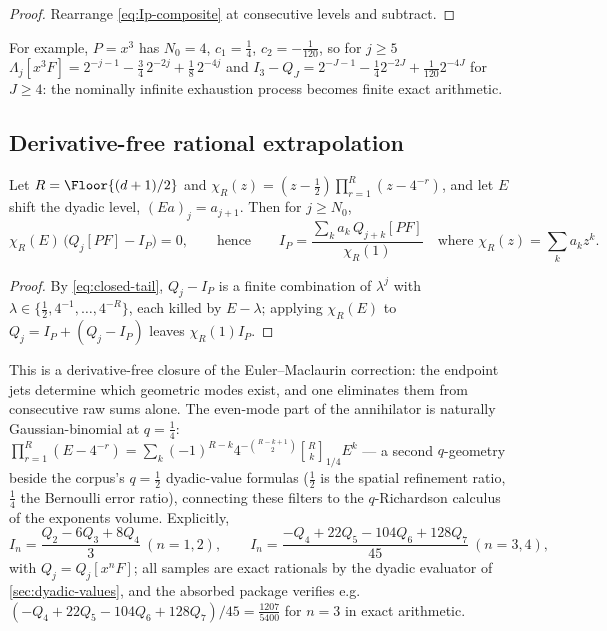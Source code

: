 \begin{proof}
Rearrange \eqref{eq:Ip-composite} at consecutive levels and subtract.
\end{proof}

For example, $P=x^{3}$ has $N_0=4$, $c_1=\tfrac14$,
$c_2=-\tfrac1{120}$, so for $j\ge5$
$\Lambda_j[x^{3}F]=2^{-j-1}-\tfrac34\,2^{-2j}+\tfrac18\,2^{-4j}$ and
$I_3-Q_J=2^{-J-1}-\tfrac14 2^{-2J}+\tfrac1{120}2^{-4J}$ for
$J\ge4$: the nominally infinite exhaustion process becomes finite
exact arithmetic.

\subsection{Derivative-free rational extrapolation}

\begin{theorem}
\label{thm:annihilator-comb}
Let $R=\Floor{(d+1)/2}$ and
$\chi_R(z)=(z-\tfrac12)\prod_{r=1}^{R}(z-4^{-r})$, and let $E$ shift
the dyadic level, $(Ea)_j=a_{j+1}$.  Then for $j\ge N_0$,
\begin{equation}
 \chi_R(E)\,\bigl(Q_j[PF]-I_P\bigr)=0,
 \qquad\text{hence}\qquad
 I_P=\frac{\sum_{k}a_k\,Q_{j+k}[PF]}{\chi_R(1)}
 \quad\text{where }\chi_R(z)=\sum_ka_kz^{k}.
 \label{eq:annihilator}
\end{equation}
\end{theorem}

\begin{proof}
By \eqref{eq:closed-tail}, $Q_j-I_P$ is a finite combination of
$\lambda^{j}$ with
$\lambda\in\{\tfrac12,4^{-1},\ldots,4^{-R}\}$, each killed by
$E-\lambda$; applying $\chi_R(E)$ to $Q_j=I_P+(Q_j-I_P)$ leaves
$\chi_R(1)I_P$.
\end{proof}

This is a derivative-free closure of the Euler--Maclaurin correction:
the endpoint jets determine which geometric modes exist, and one
eliminates them from consecutive raw sums alone.  The even-mode part
of the annihilator is naturally Gaussian-binomial at $q=\tfrac14$:
$\prod_{r=1}^{R}(E-4^{-r})
=\sum_{k}(-1)^{R-k}4^{-\binom{R-k+1}2}
\genfrac{[}{]}{0pt}{}{R}{k}_{1/4}E^{k}$ --- a second $q$-geometry
beside the corpus's $q=\tfrac12$ dyadic-value formulas ($\tfrac12$ is
the spatial refinement ratio, $\tfrac14$ the Bernoulli error ratio),
connecting these filters to the $q$-Richardson calculus of the
exponents volume.  Explicitly,
\begin{equation}
 I_n=\frac{Q_2-6Q_3+8Q_4}{3}\ (n=1,2),
 \qquad
 I_n=\frac{-Q_4+22Q_5-104Q_6+128Q_7}{45}\ (n=3,4),
 \label{eq:richardson-explicit}
\end{equation}
with $Q_j=Q_j[x^{n}F]$; all samples are exact rationals by the dyadic
evaluator of \cref{sec:dyadic-values}, and the absorbed package
verifies e.g.\ $(-Q_4+22Q_5-104Q_6+128Q_7)/45=\tfrac{1207}{5400}$ for
$n=3$ in exact arithmetic.

